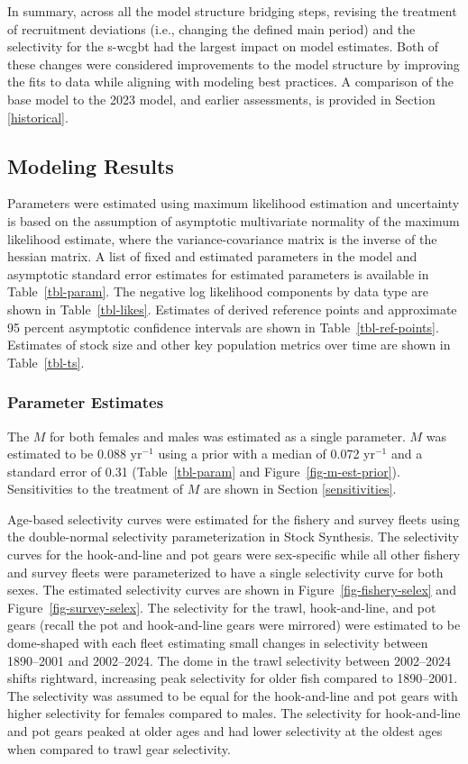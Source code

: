 \documentclass[
  english,
]{article}
\begin{document}
In summary, across all the model structure bridging steps, revising the
treatment of recruitment deviations (i.e., changing the defined main
period) and the selectivity for the \gls{s-wcgbt} had the largest impact
on model estimates. Both of these changes were considered improvements
to the model structure by improving the fits to data while aligning with
modeling best practices. A comparison of the base model to the 2023
model, and earlier assessments, is provided in Section \ref{historical}.

\subsection{Modeling Results}\label{modeling-results}

Parameters were estimated using maximum likelihood estimation and
uncertainty is based on the assumption of asymptotic multivariate
normality of the maximum likelihood estimate, where the
variance-covariance matrix is the inverse of the hessian matrix. A list
of fixed and estimated parameters in the model and asymptotic standard
error estimates for estimated parameters is available in
Table~\ref{tbl-param}. The negative log likelihood components by data
type are shown in Table~\ref{tbl-likes}. Estimates of derived reference
points and approximate 95 percent asymptotic confidence intervals are
shown in Table~\ref{tbl-ref-points}. Estimates of stock size and other
key population metrics over time are shown in Table~\ref{tbl-ts}.

\subsubsection{Parameter Estimates}\label{parameter-estimates}

The \(M\) for both females and males was estimated as a single
parameter. \(M\) was estimated to be 0.088 yr\(^{-1}\) using a prior
with a median of 0.072 yr\(^{-1}\) and a standard error of 0.31
(Table~\ref{tbl-param} and Figure~\ref{fig-m-est-prior}). Sensitivities
to the treatment of \(M\) are shown in Section \ref{sensitivities}.

Age-based selectivity curves were estimated for the fishery and survey
fleets using the double-normal selectivity parameterization in Stock
Synthesis. The selectivity curves for the hook-and-line and pot gears
were sex-specific while all other fishery and survey fleets were
parameterized to have a single selectivity curve for both sexes. The
estimated selectivity curves are shown in Figure~\ref{fig-fishery-selex}
and Figure~\ref{fig-survey-selex}. The selectivity for the trawl,
hook-and-line, and pot gears (recall the pot and hook-and-line gears
were mirrored) were estimated to be dome-shaped with each fleet
estimating small changes in selectivity between 1890--2001 and
2002--2024. The dome in the trawl selectivity between 2002--2024 shifts
rightward, increasing peak selectivity for older fish compared to
1890--2001. The selectivity was assumed to be equal for the
hook-and-line and pot gears with higher selectivity for females compared
to males. The selectivity for hook-and-line and pot gears peaked at
older ages and had lower selectivity at the oldest ages when compared to
trawl gear selectivity.
\end{document}

